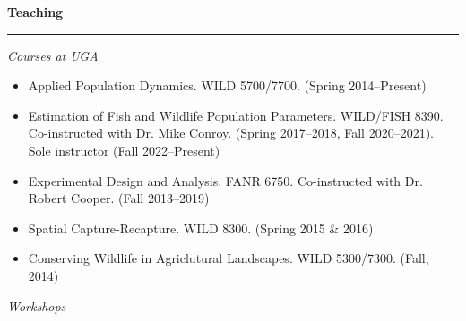 \documentclass[12pt]{article}
\begin{document}
\vspace{0.5cm}






{\large \bf Teaching} \\
\rule[3mm]{\textwidth}{0.3mm}

{\it Courses at UGA}

\begin{itemize}

\item Applied Population Dynamics. WILD 5700/7700. (Spring 2014--Present)

\item Estimation of Fish and Wildlife Population Parameters. WILD/FISH
  8390. Co-instructed with Dr. Mike Conroy. (Spring 2017--2018, Fall
  2020--2021). Sole instructor (Fall 2022--Present)

\item Experimental Design and Analysis. FANR 6750. Co-instructed with
  Dr. Robert Cooper. (Fall 2013--2019)

\item Spatial Capture-Recapture. WILD 8300. (Spring 2015 \& 2016)

\item Conserving Wildlife in Agriclutural Landscapes. WILD
  5300/7300. (Fall, 2014) 

\end{itemize}

\vspace{0.5cm}

{\it Workshops}
\end{document}
